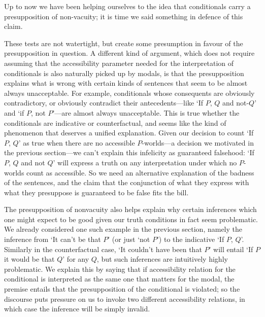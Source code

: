 \documentclass[If.tex]{subfiles}
\begin{document}
%

Up to now we have been helping ourselves to the idea that conditionals carry a presupposition of non-vacuity; it is time we said something in defence of this claim.  

These tests are not watertight, but create some presumption in favour of the presupposition in question.  A different kind of argument, which does not require assuming that the accessibility parameter needed for the interpretation of conditionals is also naturally picked up by modals, is that the presupposition explains what is wrong with certain kinds of sentences that seem to be almost always unacceptable. For example, conditionals whose consequents are obviously contradictory, or obviously contradict their antecedents---like ‘If $P$, $Q$ and not-$Q$’ and ‘if $P$, not $P$’---are almost always unacceptable.  This is true whether the conditionals are indicative or counterfactual, and seems like the kind of phenomenon that deserves a unified explanation. Given our decision to count ‘If $P$, $Q$’ as true when there are no accessible $P$-worlds---a decision we motivated in the previous section---we can't explain this infelicity as guaranteed falsehood: ‘If $P$, $Q$ and not $Q$’ will express a truth on any interpretation under which no $P$-worlds count as accessible. So we need an alternative explanation of the badness of the sentences, and the claim that the conjunction of what they express with what they presuppose is guaranteed to be false fits the bill.

The presupposition of nonvacuity also helps explain why certain inferences which one might expect to be good given our truth conditions in fact seem problematic. We already considered one such example in the previous section, namely the inference from ‘It can't be that $P$’ (or just ‘not $P$’) to the indicative ‘If $P$, $Q$’.  Similarly in the counterfactual case, ‘It couldn't have been that $P$’ will entail ‘If $P$ it would be that $Q$’ for any $Q$, but such inferences are intuitively highly problematic.  We explain this by saying that if accessibility relation for the conditional is interpreted as the same one that matters for the modal, the premise entails that the presupposition of the conditional is violated; so the discourse puts pressure on us to invoke two different accessibility relations, in which case the inference will be simply invalid.
\end{document}
